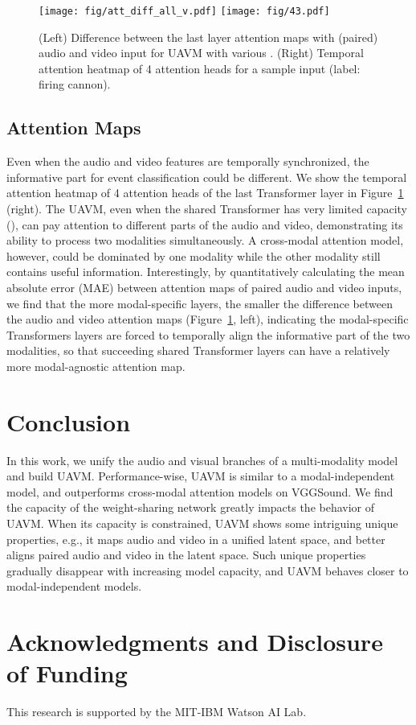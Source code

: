 \documentclass[journal]{IEEEtran}
\newcommand{\squeezeup}{\vspace{-1.6mm}}
\newcommand{\rev}[1]{{\color{dblue} #1}}
\begin{document}
\begin{figure}[t]
\minipage{2.4cm}
  \texttt{[image: fig/att\_diff\_all\_v.pdf]}
\endminipage\hfill
\minipage{6.5cm}
  \texttt{[image: fig/43.pdf]}
\endminipage
\vspace{-0.5em}
\caption{(Left) Difference between the last layer attention maps with (paired) audio and video input for UAVM with various . (Right) Temporal attention heatmap of 4 attention heads for a sample input (label: firing cannon). }
\label{fig:exp4}
\vspace{-1.0em}
\end{figure}

\squeezeup\squeezeup
\subsection{Attention Maps}

Even when the audio and video features are temporally synchronized, the informative part for event classification could be different. We show the temporal attention heatmap of 4 attention heads of the last Transformer layer in Figure~\ref{fig:exp4} (right). The UAVM, even when the shared Transformer has very limited capacity (), can pay attention to different parts of the audio and video, demonstrating its ability to process two modalities simultaneously. A cross-modal attention model, however, could be dominated by one modality while the other modality still contains useful information. Interestingly, by quantitatively calculating the mean absolute error (MAE) between attention maps of paired audio and video inputs, we find that the more modal-specific layers, the smaller the difference between the audio and video attention maps (Figure~\ref{fig:exp4}, left), indicating the modal-specific Transformers layers are forced to temporally align the informative part of the two modalities, so that succeeding shared Transformer layers can have a relatively more modal-agnostic attention map. 

\squeezeup
\section{Conclusion}

\rev{In this work, we unify the audio and visual branches of a multi-modality model and build UAVM. Performance-wise, UAVM is similar to a modal-independent model, and outperforms cross-modal attention models on VGGSound. We find the capacity of the weight-sharing network greatly impacts the behavior of UAVM. When its capacity is constrained, UAVM shows some intriguing unique properties, e.g., it maps audio and video in a unified latent space, and better aligns paired audio and video in the latent space. Such unique properties gradually disappear with increasing model capacity, and UAVM behaves closer to modal-independent models.}

\section{Acknowledgments and Disclosure of Funding}
\rev{This research is supported by the MIT-IBM Watson AI Lab.}



\end{document}

